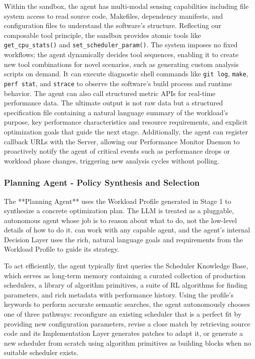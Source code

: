 Within the sandbox, the agent has multi-modal sensing capabilities including file system access to read source code, Makefiles, dependency manifests, and configuration files to understand the software's structure. Reflecting our composable tool principle, the sandbox provides atomic tools like \texttt{get\_cpu\_stats()} and \texttt{set\_scheduler\_param()}. The system imposes no fixed workflows; the agent dynamically decides tool sequences, enabling it to create new tool combinations for novel scenarios, such as generating custom analysis scripts on demand. It can execute diagnostic shell commands like \texttt{git log}, \texttt{make}, \texttt{perf stat}, and \texttt{strace} to observe the software's build process and runtime behavior. The agent can also call structured metric APIs for real-time performance data. The ultimate output is not raw data but a structured specification file containing a natural language summary of the workload's purpose, key performance characteristics and resource requirements, and explicit optimization goals that guide the next stage. Additionally, the agent can register callback URLs with the \sys Server, allowing our Performance Monitor Daemon to proactively notify the agent of critical events such as performance drops or workload phase changes, triggering new analysis cycles without polling.

\subsubsection{Planning Agent - Policy Synthesis and Selection}

The **Planning Agent** uses the Workload Profile generated in Stage 1 to synthesize a concrete optimization plan. The LLM is treated as a pluggable, autonomous agent whose job is to reason about what to do, not the low-level details of how to do it. \sys can work with any capable agent, and the agent's internal Decision Layer uses the rich, natural language goals and requirements from the Workload Profile to guide its strategy.

To act efficiently, the agent typically first queries the Scheduler Knowledge Base, which serves as long-term memory containing a curated collection of production schedulers, a library of algorithm primitives, a suite of RL algorithms for finding parameters, and rich metadata with performance history. Using the profile's keywords to perform accurate semantic searches, the agent autonomously chooses one of three pathways: reconfigure an existing scheduler that is a perfect fit by providing new configuration parameters, revise a close match by retrieving source code and its Implementation Layer generates patches to adapt it, or generate a new scheduler from scratch using algorithm primitives as building blocks when no suitable scheduler exists.

